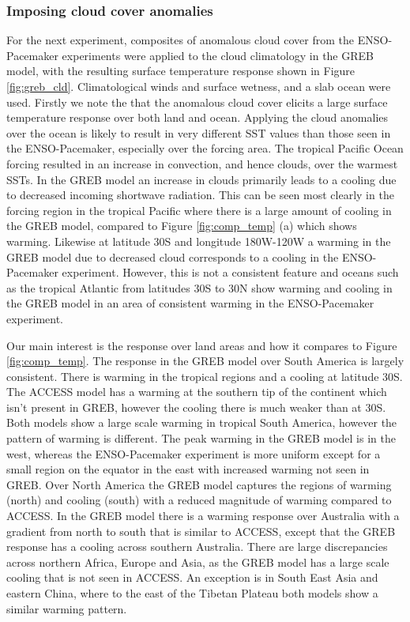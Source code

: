 \subsubsection{Imposing cloud cover anomalies}
For the next experiment, composites of anomalous cloud cover from the 
ENSO-Pacemaker experiments were applied to the cloud climatology in the GREB 
model, with the resulting surface temperature response shown in Figure 
\ref{fig:greb_cld}. Climatological winds and surface wetness, and a slab ocean 
were used. Firstly we note the that the anomalous cloud cover elicits a large 
surface temperature response over both land and ocean.  Applying the cloud 
anomalies over the ocean is likely to result in very different SST values than 
those seen in the ENSO-Pacemaker, especially over the forcing area.  The 
tropical Pacific Ocean forcing resulted in an increase in convection, and hence 
clouds, over the warmest SSTs. In the GREB model an increase in clouds primarily 
leads to a cooling due to decreased incoming shortwave radiation. This can be 
seen most clearly in the forcing region in the tropical Pacific where there is a 
large amount of cooling in the GREB model, compared to Figure 
\ref{fig:comp_temp} (a) which shows warming.  Likewise at latitude 30S and 
longitude 180W-120W a warming in the GREB model due to decreased cloud 
corresponds to a cooling in the ENSO-Pacemaker experiment.  However, this is not 
a consistent feature and oceans such as the tropical Atlantic from latitudes 
30S to 30N show warming and cooling in the GREB model in an area of consistent 
warming in the ENSO-Pacemaker experiment.

Our main interest is the response over land areas and how it compares to Figure 
\ref{fig:comp_temp}. The response in the GREB model over South America is 
largely consistent. There is warming in the tropical regions and a cooling at 
latitude 30S. The ACCESS model has a warming at the southern tip of the 
continent which isn't present in GREB, however the cooling there is much weaker 
than at 30S.  Both models show a large scale warming in tropical South America, 
however the pattern of warming is different. The peak warming in the GREB model 
is in the west, whereas the ENSO-Pacemaker experiment is more uniform except for 
a small region on the equator in the east with increased warming not seen in 
GREB.  Over North America the GREB model captures the regions of warming (north) 
and cooling (south) with a reduced magnitude of warming compared to ACCESS. In 
the GREB model there is a warming response over Australia with a gradient from 
north to south that is similar to ACCESS, except that the GREB response has a 
cooling across southern Australia.  There are large discrepancies across 
northern Africa, Europe and Asia, as the GREB model has a large scale cooling 
that is not seen in ACCESS. An exception is in South East Asia and eastern 
China, where to the east of the Tibetan Plateau both models show a similar 
warming pattern. 

